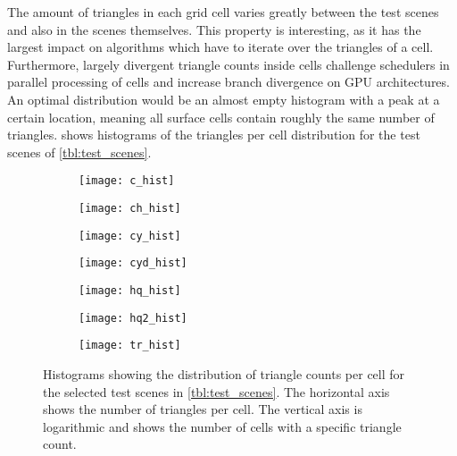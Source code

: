 The amount of triangles in each grid cell varies greatly between the test scenes and also in the scenes themselves.
This property is interesting, as it has the largest impact on algorithms which have to iterate over the triangles of a cell.
Furthermore, largely divergent triangle counts inside cells challenge schedulers in parallel processing of cells and increase branch divergence on GPU architectures.
An optimal distribution would be an almost empty histogram with a peak at a certain location, meaning all surface cells contain roughly the same number of triangles.
 shows histograms of the triangles per cell distribution for the test scenes of \cref{tbl:test_scenes}.
%
\begin{figure}[!]
	\centering
	\begin{subfigure}[b]{0.49\textwidth}
		\centering
		\texttt{[image: c\_hist]}
		\caption{\cubes}
		\label{fig:cube2_histogram}
	\end{subfigure}
	\begin{subfigure}[b]{0.49\textwidth}
		\centering
		\texttt{[image: ch\_hist]}
		\caption{\cylinderhead}
		\label{fig:cylinder_head_histogram}
	\end{subfigure}
	\begin{subfigure}[b]{0.49\textwidth}
		\centering
		\texttt{[image: cy\_hist]}
		\caption{\cylinders}
		\label{fig:cylinders_histogram}
	\end{subfigure}
	\begin{subfigure}[b]{0.49\textwidth}
		\centering
		\texttt{[image: cyd\_hist]}
		\caption{\cylindersd}
		\label{fig:cylinders_d_histogram}
	\end{subfigure}
	\begin{subfigure}[b]{0.49\textwidth}
		\centering
		\texttt{[image: hq\_hist]}
		\caption{\impeller}
		\label{fig:impeller_histogram}
	\end{subfigure}
	\begin{subfigure}[b]{0.49\textwidth}
		\centering
		\texttt{[image: hq2\_hist]}
		\caption{\impellerhalf}
		\label{fig:impeller_2_histogram}
	\end{subfigure}
	\begin{subfigure}[b]{0.49\textwidth}
		\centering
		\texttt{[image: tr\_hist]}
		\caption{\turbine}
		\label{fig:turbine_histogram}
	\end{subfigure}
	\caption[Test scene histograms]{
		Histograms showing the distribution of triangle counts per cell for the selected test scenes in \cref{tbl:test_scenes}.
		The horizontal axis shows the number of triangles per cell.
		The vertical axis is logarithmic and shows the number of cells with a specific triangle count.
	}
	\label{fig:histograms}
\end{figure}

